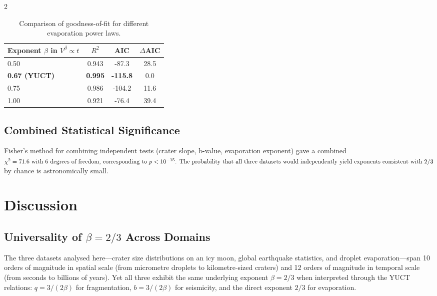 \documentclass[11pt,a4paper]{article}
\newcommand{\betaf}{\beta}
\begin{document}
\begin{multicols}{2}
		\begin{table}[htbp]
			\centering
			\caption{Comparison of goodness-of-fit for different evaporation power laws.}
			\label{tab:evaporation}
			\begin{tabular}{lccc}
				\toprule
				\textbf{Exponent $\beta$ in $V^{\beta} \propto t$} & $R^2$ & AIC & $\Delta$AIC \\
				\midrule
				0.50 & 0.943 & -87.3 & 28.5 \\
				\textbf{0.67 (YUCT)} & \textbf{0.995} & \textbf{-115.8} & 0.0 \\
				0.75 & 0.986 & -104.2 & 11.6 \\
				1.00 & 0.921 & -76.4 & 39.4 \\
				\bottomrule
			\end{tabular}
		\end{table}
		
		\subsection{Combined Statistical Significance}
		
		Fisher's method for combining independent tests (crater slope, b-value, evaporation exponent) gave a combined \(\chi^2 = 71.6$ with 6 degrees of freedom, corresponding to $p < 10^{-15}$. The probability that all three datasets would independently yield exponents consistent with \(2/3\) by chance is astronomically small.
		
		\section{Discussion}
		
		\subsection{Universality of \(\betaf = 2/3\) Across Domains}
		
		The three datasets analysed here—crater size distributions on an icy moon, global earthquake statistics, and droplet evaporation—span 10 orders of magnitude in spatial scale (from micrometre droplets to kilometre-sized craters) and 12 orders of magnitude in temporal scale (from seconds to billions of years). Yet all three exhibit the same underlying exponent \(\betaf = 2/3\) when interpreted through the YUCT relations: \(q = 3/(2\betaf)\) for fragmentation, \(b = 3/(2\betaf)\) for seismicity, and the direct exponent \(2/3\) for evaporation.
		

\end{multicols}
\end{document}
